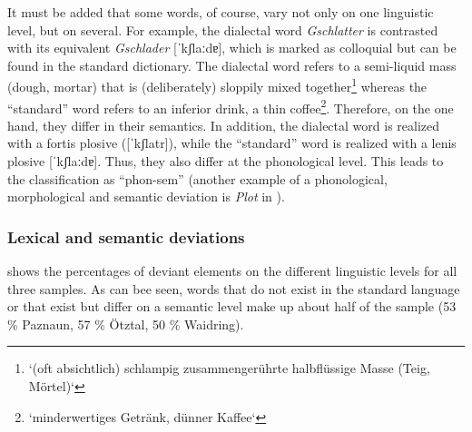 \documentclass[output=paper]{langscibook}
\begin{document}
It must be added that some words, of course, vary not only on one linguistic level, but on several. For example, the dialectal word \textit{Gschlatter} is contrasted with its equivalent \textit{Gschlader} [ˈkʃlaːdɐ], which is marked as colloquial but can be found in the standard dictionary. The dialectal word refers to a semi-liquid mass (dough, mortar) that is (deliberately) sloppily mixed together\footnote{‘(oft absichtlich) schlampig zusammengerührte halbflüssige Masse (Teig, Mörtel)‘} whereas the “standard” word refers to an inferior drink, a thin coffee\footnote{‘minderwertiges Getränk, dünner Kaffee‘}. Therefore, on the one hand, they differ in their semantics. In addition, the dialectal word is realized with a fortis plosive ([ˈkʃlatr]), while the “standard” word is realized with a lenis plosive [ˈkʃlaːdɐ]. Thus, they also differ at the phonological level. This leads to the classification as “phon-sem” (another example of a phonological, morphological and semantic deviation is \textit{Plot} in ).


\subsubsection{Lexical and semantic deviations}
\label{sec:kathrein:5.1.1}

 shows the percentages of deviant elements on the different linguistic levels for all three samples. As can bee seen, words that do not exist in the standard language or that exist but differ on a semantic level make up about half of the sample (53 \% Paznaun, 57 \% Ötztal, 50 \% Waidring).
\end{document}
